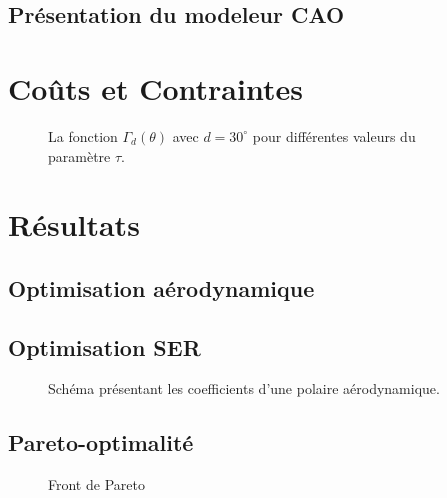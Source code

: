 \subsection{Présentation du modeleur CAO}
\lipsum

\section{Coûts et Contraintes}
\lipsum

\begin{figure}
	\centering
    
    \caption{La fonction $\Gamma_d(\theta)$ avec $d = 30^\circ$ pour différentes valeurs du paramètre $\tau$.}
	\label{fig:gamma-d}
\end{figure}

\section{Résultats}
\lipsum
\subsection{Optimisation aérodynamique}
\lipsum
\subsection{Optimisation SER}
\lipsum

\begin{figure}[htp]
    \centering
    
    \caption{Schéma présentant les coefficients d'une polaire aérodynamique.}
    \label{fig:schemas-polaire}
\end{figure}

\subsection{Pareto-optimalité}
\begin{table}
    {
    \footnotesize
    
    }
    \caption{Résumé des valeurs des critères et des contraintes pour certains points du front de Pareto.}
    \label{tab:recap}
\end{table}

\lipsum

\begin{figure}[htp]
    \centering
    
    \caption{Front de Pareto}
    \label{fig:pareto-front}
\end{figure}

